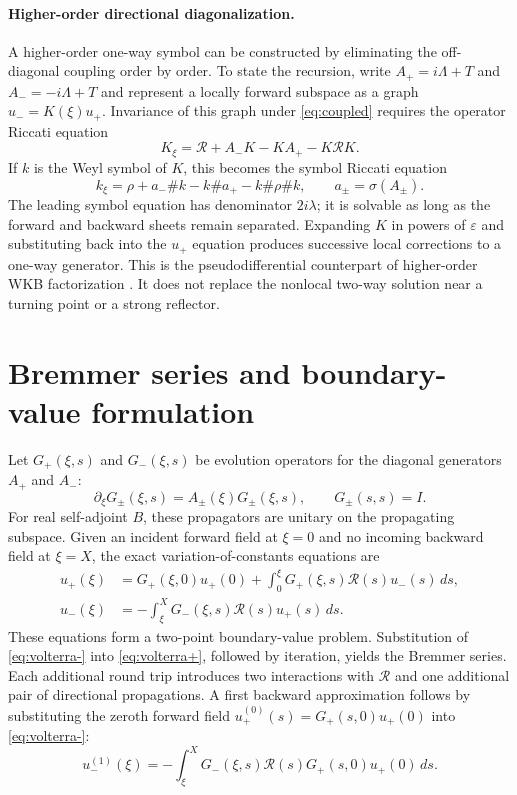 \documentclass[11pt]{article}
\newcommand{\pd}{\partial}
\newcommand{\Rop}{\mathcal R}
\newcommand{\eps}{\varepsilon}
\begin{document}
\paragraph{Higher-order directional diagonalization.} A higher-order
one-way symbol can be constructed by eliminating the off-diagonal coupling
order by order. To state the recursion, write
$A_+=i\Lambda+T$ and $A_-=-i\Lambda+T$ and represent a locally forward
subspace as a graph $u_-=K(\xi)u_+$. Invariance of this graph under
\eqref{eq:coupled} requires the operator Riccati equation
\begin{equation}\label{eq:graphriccati}
  K_\xi=\Rop+A_-K-KA_+-K\Rop K.
\end{equation}
If $k$ is the Weyl symbol of $K$, this becomes the symbol Riccati equation
\begin{equation}\label{eq:graphriccatisymbol}
  k_\xi=\rho+a_-\# k-k\# a_+-k\#\rho\# k,
  \qquad a_\pm=\sigma(A_\pm).
\end{equation}
The leading symbol equation has denominator $2i\lambda$; it is solvable as
long as the forward and backward sheets remain separated. Expanding $K$ in
powers of $\eps$ and substituting back into the $u_+$ equation produces
successive local corrections to a one-way generator. This is the
pseudodifferential counterpart of higher-order WKB factorization
\cite{fishman,stolk}. It does not replace the nonlocal two-way solution near
a turning point or a strong reflector.

\section{Bremmer series and boundary-value formulation}

Let $G_+(\xi,s)$ and $G_-(\xi,s)$ be evolution operators for the diagonal
generators $A_+$ and $A_-$:
\begin{equation}\label{eq:G}
  \pd_\xi G_\pm(\xi,s)=A_\pm(\xi)G_\pm(\xi,s),\qquad
  G_\pm(s,s)=I.
\end{equation}
For real self-adjoint $B$, these propagators are unitary on the propagating
subspace. Given an incident forward field at $\xi=0$ and no incoming
backward field at $\xi=X$, the exact variation-of-constants equations are
\begin{align}
  u_+(\xi)&=G_+(\xi,0)u_+(0)+
  \int_0^\xi G_+(\xi,s)\Rop(s)u_-(s)\,ds,\label{eq:volterra+}\\
  u_-(\xi)&=-\int_\xi^X G_-(\xi,s)\Rop(s)u_+(s)\,ds.
  \label{eq:volterra-}
\end{align}
These equations form a two-point boundary-value problem. Substitution of
\eqref{eq:volterra-} into \eqref{eq:volterra+}, followed by iteration, yields
the Bremmer series. Each additional round trip introduces two interactions
with $\Rop$ and one additional pair of directional propagations. A first
backward approximation follows by substituting the zeroth forward field
$u_+^{(0)}(s)=G_+(s,0)u_+(0)$ into \eqref{eq:volterra-}:
\begin{equation}\label{eq:firstreflection}
  u_-^{(1)}(\xi)=-\int_\xi^X G_-(\xi,s)\Rop(s)G_+(s,0)u_+(0)\,ds.
\end{equation}
\end{document}
